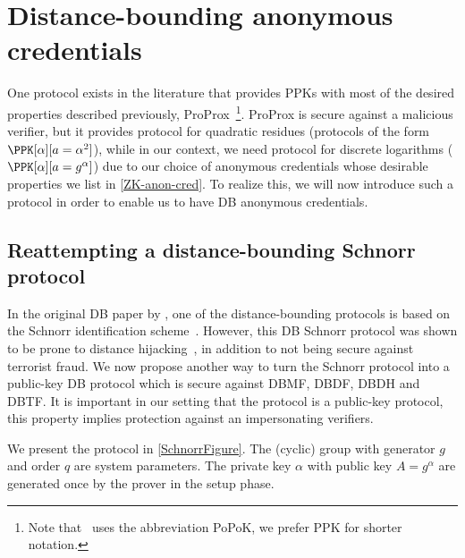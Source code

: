 \section{Distance-bounding anonymous credentials}%
\label{DB-anon-cred}

One protocol exists in the literature that provides \acp{PPK} with most of the 
desired properties described previously, ProProx~\cite{ProProx}\footnote{Note 
  that~\cite{ProProx} uses the abbreviation PoPoK, we prefer \acs{PPK} for 
  shorter notation.}.
ProProx is secure against a malicious verifier, but it provides  
protocol for quadratic residues (\ie protocols of the form \(\PPK[\alpha][a = 
  \alpha^2]\)), while in our context, we need  protocol for discrete 
logarithms (\ie \(\PPK[\alpha][a = g^\alpha]\)) due to our choice of 
anonymous credentials whose desirable properties we list in
\cref{ZK-anon-cred}.%
To realize this, we will now introduce such a protocol in order to enable us to have \ac{DB} anonymous credentials.

\subsection{Reattempting a distance-bounding Schnorr protocol}%
\label{DBSchnorr}

In the original \ac{DB} paper by \citet{DistanceBounding}, one of the 
distance-bounding protocols is based on the Schnorr identification 
scheme~\cite{Schnorr}.
However, this \ac{DB} Schnorr protocol was shown to be prone to distance hijacking~\cite{DistanceHijacking, TamarinDB}, in addition to not being secure against terrorist fraud.
We now propose another way to turn the Schnorr protocol into a
public-key \ac{DB} protocol which is secure against \ac{DBMF},
\ac{DBDF}, \ac{DBDH} and \ac{DBTF}.
It is important in our setting that the protocol is a public-key protocol, this 
property implies protection against an impersonating verifiers.

We present the protocol in \cref{SchnorrFigure}.
The (cyclic) group with generator \(g\) and order \(q\) are system parameters.
The private key \(\alpha\) with public key \(A = g^\alpha\) are generated once 
by the prover in the setup phase.

